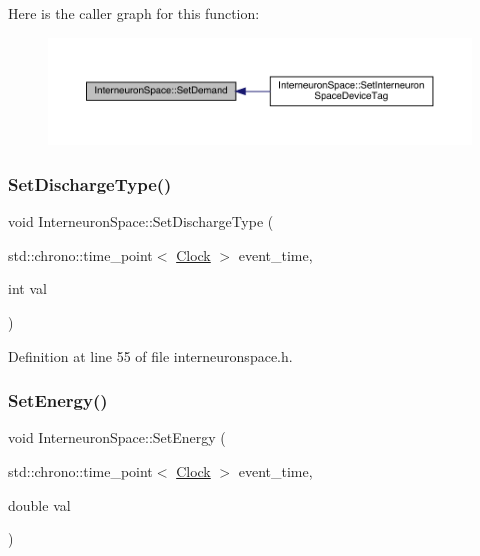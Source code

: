 Here is the caller graph for this function\+:\nopagebreak
\begin{figure}[H]
\begin{center}
\leavevmode
\includegraphics[width=350pt]{class_interneuron_space_ad2225077a049e78ce583a79eee2d373f_icgraph}
\end{center}
\end{figure}
\mbox{\label{class_interneuron_space_a7fc404aae98d45ccad26b5c186fab6e2}} 
\subsubsection{\texorpdfstring{Set\+Discharge\+Type()}{SetDischargeType()}}
{\footnotesize\ttfamily void Interneuron\+Space\+::\+Set\+Discharge\+Type (\begin{DoxyParamCaption}\item[{std\+::chrono\+::time\+\_\+point$<$ \hyperlink{universe_8h_a0ef8d951d1ca5ab3cfaf7ab4c7a6fd80}{Clock} $>$}]{event\+\_\+time,  }\item[{int}]{val }\end{DoxyParamCaption})\hspace{0.3cm}{\ttfamily [inline]}}



Definition at line 55 of file interneuronspace.\+h.

\mbox{\label{class_interneuron_space_a65ecd1914ab039707313beb1b8702e68}} 
\subsubsection{\texorpdfstring{Set\+Energy()}{SetEnergy()}}
{\footnotesize\ttfamily void Interneuron\+Space\+::\+Set\+Energy (\begin{DoxyParamCaption}\item[{std\+::chrono\+::time\+\_\+point$<$ \hyperlink{universe_8h_a0ef8d951d1ca5ab3cfaf7ab4c7a6fd80}{Clock} $>$}]{event\+\_\+time,  }\item[{double}]{val }\end{DoxyParamCaption})\hspace{0.3cm}{\ttfamily [inline]}}



